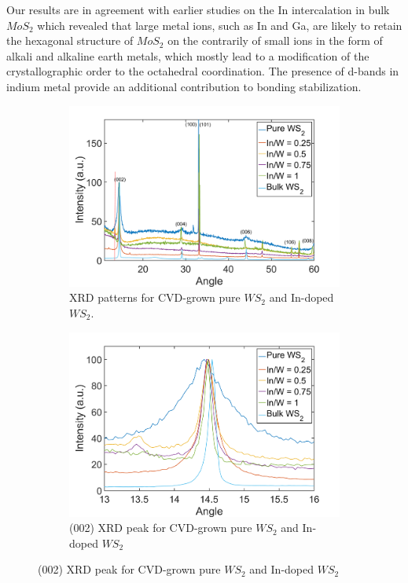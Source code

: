 Our results are in agreement with earlier studies on the In intercalation in bulk $MoS_2$ which revealed that large metal ions, such as In and Ga, are likely to retain the hexagonal structure of $MoS_2$ on the contrarily of small ions in the form of alkali and alkaline earth metals, which mostly lead to a modification of the crystallographic order \cite{Somoano1979} to the octahedral coordination. The presence of d-bands in indium metal provide an additional contribution to bonding stabilization.
 

\begin{figure}[!h]
	\begin{center}
		\begin{subfigure}[b]{1\textwidth}
			\includegraphics[scale=0.35]{In/XRDAll.png}
			\caption{XRD patterns for CVD-grown pure $WS_2$ and In-doped $WS_2$.}
			\label{fig:InXRDAll}
		\end{subfigure}
		\qquad
		\begin{subfigure}[b]{1\textwidth}
			\includegraphics[scale=0.35]{In/XRDIn.png}
			\caption{(002) XRD peak for CVD-grown pure $WS_2$ and In-doped $WS_2$}
			\label{fig:InXRDIn}
		\end{subfigure}
		\label{fig:InXRDSpectra}
	\end{center}
\end{figure}

